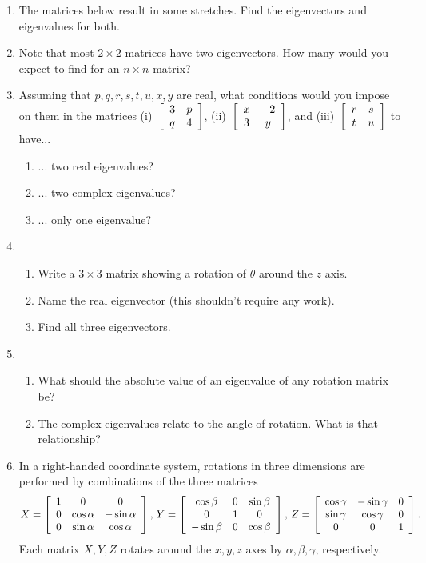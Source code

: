 \documentclass[../textbook.tex]{subfiles}
\begin{document}
\begin{enumerate}
\item The matrices below result in some stretches. Find the eigenvectors and eigenvalues for both.
\begin{enumerate}
\end{enumerate}
\item Note that most $2\times 2$ matrices have two eigenvectors. How many would you expect to find for an $n\times n$ matrix?
\item Assuming that $p,q,r,s,t,u,x,y$ are real, what conditions would you impose on them in the matrices (i)~$\left[\begin{array}{cc} 3 & p \\ q & 4 \end{array}\right]$, (ii)~$\left[\begin{array}{cc} x & -2 \\ 3 & y \end{array}\right]$, and (iii)~$\left[\begin{array}{cc} r & s \\ t & u \end{array}\right]$ to have...
\begin{enumerate}
\item ... two real eigenvalues?
\item ... two complex eigenvalues?
\item ... only one eigenvalue?
\end{enumerate}
\item \begin{enumerate}
\item Write a $3\times 3$ matrix showing a rotation of $\theta$ around the $z$ axis.
\item Name the real eigenvector (this shouldn't require any work).
\item Find all three eigenvectors.
\end{enumerate}
\item \begin{enumerate}
\item What should the absolute value of an eigenvalue of any rotation matrix be?
\item The complex eigenvalues relate to the angle of rotation. What is that relationship?
\end{enumerate}
\item In a right-handed coordinate system, rotations in three dimensions are performed by combinations of the three matrices
$$X=\left[\begin{array}{ccc} 1 & 0 & 0 \\ 0 & \cos\alpha & -\sin\alpha \\ 0 & \sin\alpha & \cos\alpha \end{array}\right],\, Y=\left[\begin{array}{ccc} \cos\beta & 0 & \sin\beta \\ 0 & 1 & 0 \\ -\sin\beta & 0 & \cos\beta \end{array}\right],\, Z=\left[\begin{array}{ccc} \cos\gamma & -\sin\gamma & 0 \\ \sin\gamma & \cos\gamma & 0 \\ 0 & 0 & 1 \end{array}\right].$$
Each matrix $X,Y,Z$ rotates around the $x,y,z$ axes by $\alpha,\beta,\gamma$, respectively.


\end{enumerate}
\end{document}
